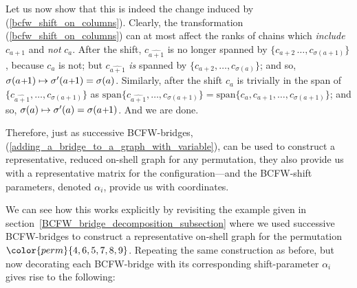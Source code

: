 \documentclass[12pt,hyperref,compress]{JHEP3}
\newcommand{\pl}{\hspace{0.5pt}\text{{\small+}}\hspace{-0.5pt}}
\begin{document}
Let us now show that this is indeed the change induced by (\ref{bcfw_shift_on_columns}). Clearly, the transformation (\ref{bcfw_shift_on_columns}) can at most affect the ranks of chains which {\it include} $c_{a+1}$ and {\it not} $c_a$. After the shift, $c_{\widehat{a+1}}$ is no longer spanned by $\{c_{a+2}\,\ldots,c_{\sigma(a+1)}\}$, because $c_{a}$ is not; but $c_{\widehat{a+1}}$ {\it is} spanned by $\{c_{a+2},\ldots,c_{\sigma(a)}\}$; and so, $\sigma(a\pl1)\mapsto\sigma'(a\pl1)=\sigma(a)$. Similarly, after the shift $c_a$ is trivially in the span of $\{c_{\widehat{a+1}},\ldots,c_{\sigma(a+1)}\}$ as $\mathrm{span}\{c_{\widehat{a+1}},\ldots,c_{\sigma(a+1)}\}=\mathrm{span}\{c_a,c_{a+1},\ldots,c_{\sigma(a+1)}\}$; and so, $\sigma(a)\mapsto\sigma'(a)=\sigma(a\pl1)$. And we are done.

Therefore, just as successive BCFW-bridges, (\ref{adding_a_bridge_to_a_graph_with_variable}), can be used to construct a representative, reduced on-shell graph for any permutation, they also provide us with a representative matrix for the configuration---and the BCFW-shift parameters, denoted $\alpha_i$, provide us with coordinates.

We can see how this works explicitly by revisiting the example given in \mbox{section \ref{BCFW_bridge_decomposition_subsection}} where we used successive BCFW-bridges to construct a representative on-shell graph for the permutation ${\color{perm}\{4,6,5,7,8,9\}}$.
Repeating the same construction as before, but now decorating each BCFW-bridge with its corresponding shift-parameter $\alpha_i$ gives rise to the following:\\[-15pt]
\end{document}
